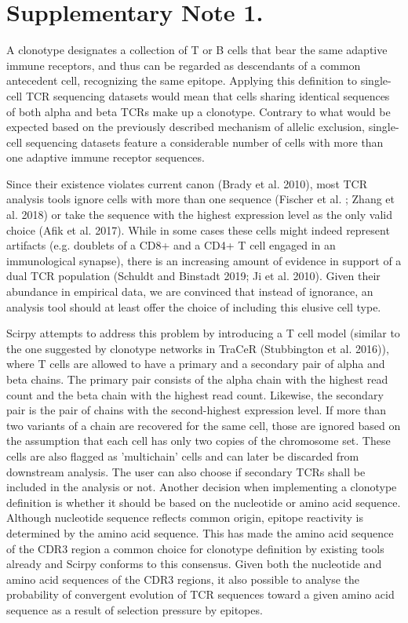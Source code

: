 \documentclass[8pt]{article}
\begin{document}
\section{Supplementary Note 1.}
A clonotype designates a collection of {\alpha} T or B cells that bear the same adaptive immune receptors, and thus can be regarded as descendants of a common antecedent cell, recognizing the same epitope. Applying this definition to single-cell TCR sequencing datasets would mean that cells sharing identical sequences of both alpha and beta TCRs make up a clonotype. Contrary to what would be expected based on the previously described mechanism of allelic exclusion, single-cell sequencing datasets feature a considerable number of cells with more than one adaptive immune receptor sequences. \par
Since their existence violates current canon (Brady et al. 2010), most TCR analysis tools ignore cells with more than one sequence (Fischer et al. ; Zhang et al. 2018) or take the sequence with the highest expression level as the only valid choice (Afik et al. 2017). While in some cases these cells might indeed represent artifacts (e.g. doublets of a CD8+ and a CD4+ T cell engaged in an immunological synapse), there is an increasing amount of evidence in support of a dual TCR population (Schuldt and Binstadt 2019; Ji et al. 2010). Given their abundance in empirical data, we are convinced that instead of ignorance, an analysis tool should at least offer the choice of including this elusive cell type. \par
Scirpy attempts to address this problem by introducing a T cell model (similar to the one suggested by clonotype networks in TraCeR (Stubbington et al. 2016)), where T cells are allowed to have a primary and a secondary pair of alpha and beta chains. The primary pair consists of the alpha chain with the highest read count and the beta chain with the highest read count. Likewise, the secondary pair is the pair of chains with the second-highest expression level. If more than two variants of a chain are recovered for the same cell, those are ignored based on the assumption that each cell has only two copies of the chromosome set. These cells are also flagged as 'multichain' cells and can later be discarded from downstream analysis. The user can also choose if secondary TCRs shall be included in the analysis or not.
Another decision when implementing a clonotype definition is whether it should be based on the nucleotide or amino acid sequence. Although nucleotide sequence reflects common origin, epitope reactivity is determined by the amino acid sequence. This has made the amino acid sequence of the CDR3 region a common choice for clonotype definition by existing tools already and Scirpy conforms to this consensus. Given both the nucleotide and amino acid sequences of the CDR3 regions, it also possible to analyse the probability of convergent evolution of TCR sequences toward a given amino acid sequence as a result of selection pressure by epitopes. \par
\end{document}
